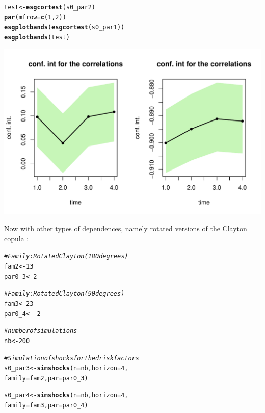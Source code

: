 \documentclass[a4paper]{article}\usepackage[]{graphicx}\usepackage[]{color}
\makeatletter
\def\maxwidth{ %
  \ifdim\Gin@nat@width>\linewidth
    \linewidth
  \else
    \Gin@nat@width
  \fi
}
\newcommand{\hlnum}[1]{\textcolor[rgb]{0.686,0.059,0.569}{#1}}%
\newcommand{\hlcom}[1]{\textcolor[rgb]{0.678,0.584,0.686}{\textit{#1}}}%
\newcommand{\hlopt}[1]{\textcolor[rgb]{0,0,0}{#1}}%
\newcommand{\hlstd}[1]{\textcolor[rgb]{0.345,0.345,0.345}{#1}}%
\newcommand{\hlkwb}[1]{\textcolor[rgb]{0.69,0.353,0.396}{#1}}%
\newcommand{\hlkwc}[1]{\textcolor[rgb]{0.333,0.667,0.333}{#1}}%
\newcommand{\hlkwd}[1]{\textcolor[rgb]{0.737,0.353,0.396}{\textbf{#1}}}%
\newenvironment{kframe}{%
 \def\at@end@of@kframe{}%
 \ifinner\ifhmode%
  \def\at@end@of@kframe{\end{minipage}}%
  \begin{minipage}{\columnwidth}%
 \fi\fi%
 \def\FrameCommand##1{\hskip\@totalleftmargin \hskip-\fboxsep
 \colorbox{shadecolor}{##1}\hskip-\fboxsep
     \hskip-\linewidth \hskip-\@totalleftmargin \hskip\columnwidth}%
 \MakeFramed {\advance\hsize-\width
   \@totalleftmargin\z@ \linewidth\hsize
   \@setminipage}}%
 {\par\unskip\endMakeFramed%
 \at@end@of@kframe}
\newenvironment{knitrout}{}{} %
\makeatother
\begin{document}
\begin{knitrout}
\color{fgcolor}\begin{kframe}
\begin{alltt}
\hlstd{test} \hlkwb{<-} \hlkwd{esgcortest}\hlstd{(s0_par2)}
\hlkwd{par}\hlstd{(}\hlkwc{mfrow}\hlstd{=}\hlkwd{c}\hlstd{(}\hlnum{1}\hlstd{,} \hlnum{2}\hlstd{))}
\hlkwd{esgplotbands}\hlstd{(}\hlkwd{esgcortest}\hlstd{(s0_par1))}
\hlkwd{esgplotbands}\hlstd{(test)}
\end{alltt}
\end{kframe}

{\centering \includegraphics[width=\maxwidth]{figure/example_simshocks_3-1} 

}



\end{knitrout}

Now with other types of dependences, namely rotated versions of the Clayton copula :

\begin{knitrout}
\color{fgcolor}\begin{kframe}
\begin{alltt}
\hlcom{# Family : Rotated Clayton (180 degrees)}
\hlstd{fam2} \hlkwb{<-} \hlnum{13}
\hlstd{par0_3} \hlkwb{<-} \hlnum{2}

\hlcom{# Family : Rotated Clayton (90 degrees)}
\hlstd{fam3} \hlkwb{<-} \hlnum{23}
\hlstd{par0_4} \hlkwb{<-} \hlopt{-}\hlnum{2}

\hlcom{# number of simulations}
\hlstd{nb} \hlkwb{<-} \hlnum{200}

\hlcom{# Simulation of shocks for the d risk factors}
\hlstd{s0_par3} \hlkwb{<-} \hlkwd{simshocks}\hlstd{(}\hlkwc{n} \hlstd{= nb,} \hlkwc{horizon} \hlstd{=} \hlnum{4}\hlstd{,}
\hlkwc{family} \hlstd{= fam2,} \hlkwc{par} \hlstd{= par0_3)}

\hlstd{s0_par4} \hlkwb{<-} \hlkwd{simshocks}\hlstd{(}\hlkwc{n} \hlstd{= nb,} \hlkwc{horizon} \hlstd{=} \hlnum{4}\hlstd{,}
\hlkwc{family} \hlstd{= fam3,} \hlkwc{par} \hlstd{= par0_4)}
\end{alltt}
\end{kframe}
\end{knitrout}
\end{document}
